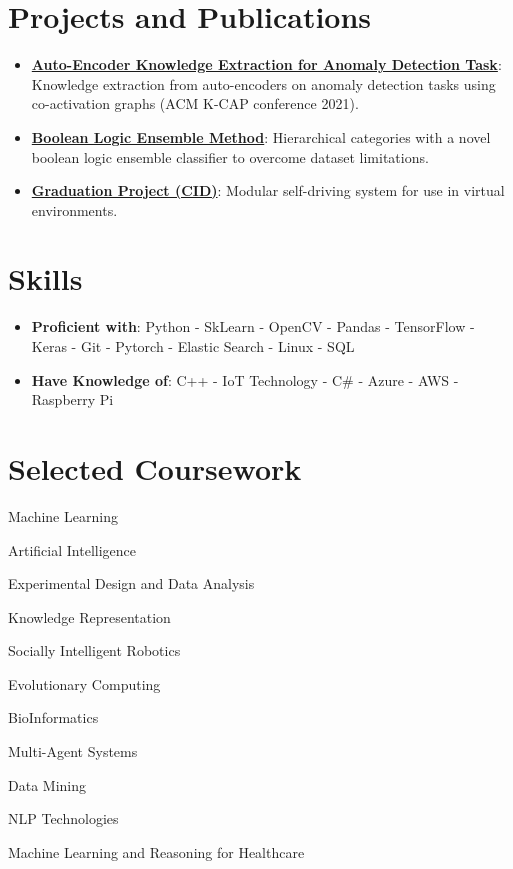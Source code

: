 \documentclass[letterpaper,11pt]{article}
\newcommand{\resumeItem}[2]{
  \item\small{
    \textbf{#1}{: #2 \vspace{-2pt}}
  }
}
\newcommand{\resumeItemNew}[1]{
	\item{
		{#1}
	}

	
}
\newcommand{\resumeNewItem}[1]{\resumeItemNew{#1}\vspace{-7pt}}
\newcommand{\resumeSubItem}[2]{\resumeItem{#1}{#2}\vspace{-5pt}}
\newcommand{\resumeSubHeadingListStart}{\begin{itemize}[leftmargin=*]}
\newcommand{\resumeSubHeadingListEnd}{\end{itemize}}
\begin{document}
\section{Projects and Publications}
  \resumeSubHeadingListStart
    \resumeSubItem{\href{https://github.com/daniyal9538/coactivation_AE_AD}{Auto-Encoder Knowledge Extraction for Anomaly Detection Task}}
      {Knowledge extraction from auto-encoders on anomaly detection tasks using co-activation graphs (ACM K-CAP conference 2021).}

\resumeSubItem{\href{https://exploringaiblog.wordpress.com/2019/09/20/implementing-hierarchical-categories-with-an-ensemble-classifier-to-overcome-dataset-limitations/}{Boolean Logic Ensemble Method}}
      {Hierarchical categories with a novel boolean logic ensemble classifier to overcome dataset limitations.}
\resumeSubItem{\href{https://github.com/daniyal9538/CID}{Graduation Project (CID)}}
      {Modular self-driving system for use in virtual environments.}
    
  \resumeSubHeadingListEnd

\section{Skills}
  \resumeSubHeadingListStart
     \item{
    	\textbf{Proficient with}{: Python  -  SkLearn - OpenCV -  Pandas - TensorFlow - Keras - Git - Pytorch - Elastic Search - Linux - SQL}
    }
    
    \item{
    	\textbf{Have Knowledge of}{: C++ - IoT Technology - C\# - Azure - AWS  - Raspberry Pi}
    	
    }
 \resumeSubHeadingListEnd




\section{Selected Coursework}
\resumeSubHeadingListStart
\begin{multicols}{2}

	\resumeNewItem{Machine Learning}
	\resumeNewItem{Artificial Intelligence}
	\resumeNewItem{Experimental Design and Data Analysis}		
	\resumeNewItem{Knowledge Representation}
	\resumeNewItem{Socially Intelligent Robotics }
	\resumeNewItem{Evolutionary Computing}
\resumeNewItem{BioInformatics}
	\resumeNewItem{Multi-Agent Systems}
	\resumeNewItem{Data Mining}
	\resumeNewItem{NLP Technologies}
	\resumeNewItem{Machine Learning and Reasoning for Healthcare}
	
	
\end{multicols}
\resumeSubHeadingListEnd
%



\end{document}
